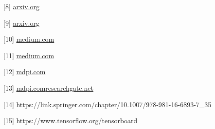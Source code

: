 \documentclass[conference]{IEEEtran}
\begin{document}
[8] \href{https://arxiv.org/html/2501.17366v1\#:~:text=technical\%20indicators\%2C\%20we\%20evaluated\%20these,which\%20showcased\%20its\%20ability}{arxiv.org}

[9] \href{https://arxiv.org/abs/2005.02217\#:~:text=what\%20we\%20develop\%20the\%20LSTM,require\%20smaller\%20input\%20sequences\%20and}{arxiv.org}

[10] \href{https://medium.com/@iamshahzu/understanding-lstm-networks-and-financial-forecasting-decoding-market-trends-with-deep-learning-6eb78a981be8\#:~:text=When\%20applied\%20to\%20financial\%20forecasting\%2C,term\%20forecasts.\%20Factors\%20such\%20as}{medium.com}

[11] \href{https://medium.com/@iamshahzu/understanding-lstm-networks-and-financial-forecasting-decoding-market-trends-with-deep-learning-6eb78a981be8\#:~:text=When\%20applied\%20to\%20financial\%20forecasting\%2C,term\%20forecasts.\%20Factors\%20such\%20as}{medium.com}

[12] \href{https://www.mdpi.com/2673-9909/5/3/76\#:~:text=models\%20demonstrate\%20promising\%20results\%20in,The\%20rapid\%20introduction\%20of\%20new}{mdpi.com}

[13] \href{https://www.mdpi.com/2673-9909/5/3/76\#:~:text=In\%20conclusion\%2C\%20stock\%20market\%20prediction,actionable\%20insights\%20in\%20this\%20domain}{mdpi.com}\href{https://www.researchgate.net/publication/380421292_Robustness_and_Interpretability_of_Machine_Learning_Models_in_Financial_Forecasting\#:~:text=The\%20field\%20of\%20financial\%20forecasting,innovations\%20because\%20of\%20the\%20ongoing}{researchgate.net}

[14] https://link.springer.com/chapter/10.1007/978-981-16-6893-7\_35

[15] https://www.tensorflow.org/tensorboard
\end{document}
